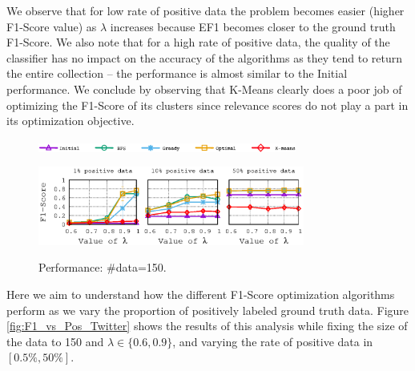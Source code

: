 We observe that for low rate of positive data the problem becomes easier (higher F1-Score value) as $\lambda$ increases because EF1 becomes closer to the ground truth F1-Score.  
We also note that for a high rate of positive data, the quality of the classifier has no impact on the accuracy of the algorithms as they tend to return the entire collection -- the performance is almost similar to the Initial performance.  We conclude by observing that K-Means clearly does a poor job of optimizing the F1-Score of its clusters since relevance scores do not play a part in its optimization objective.



\begin{figure}[H]
\begin{centering}
\includegraphics[width=8.5cm]{imgs/legend1}
\par\end{centering}
\begin{centering}
{\includegraphics[width=8.75cm]{imgs/Twitter_results/f1_performance_posrate_Data_150}}\par\end{centering}
\caption{Performance: \#data=150.}
\label{fig:F1_vs_Lambda}
\end{figure}




 Here we aim to understand how the different F1-Score optimization algorithms perform as we vary the proportion of positively labeled ground truth data.
Figure \ref{fig:F1_vs_Pos_Twitter} shows the results of this analysis while fixing the size of the data to 150 and $\lambda\in \{0.6,0.9\}$, and varying the rate of positive data in $[0.5\%,50\%]$.


